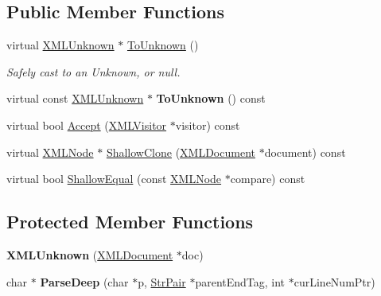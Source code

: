 \subsection*{Public Member Functions}
\begin{DoxyCompactItemize}
\item 
\mbox{\label{classCPlantBox_1_1tinyxml2_1_1XMLUnknown_afc765e12c96c97fe03571476ef8ecbb1}} 
virtual \hyperlink{classCPlantBox_1_1tinyxml2_1_1XMLUnknown}{X\+M\+L\+Unknown} $\ast$ \hyperlink{classCPlantBox_1_1tinyxml2_1_1XMLUnknown_afc765e12c96c97fe03571476ef8ecbb1}{To\+Unknown} ()
\begin{DoxyCompactList}\small\item\em Safely cast to an Unknown, or null. \end{DoxyCompactList}\item 
\mbox{\label{classCPlantBox_1_1tinyxml2_1_1XMLUnknown_a9d1c9278241128a1f4452f79d3888e01}} 
virtual const \hyperlink{classCPlantBox_1_1tinyxml2_1_1XMLUnknown}{X\+M\+L\+Unknown} $\ast$ {\bfseries To\+Unknown} () const
\item 
virtual bool \hyperlink{classCPlantBox_1_1tinyxml2_1_1XMLUnknown_a706a5d7b3056facf31ba66a316ddf912}{Accept} (\hyperlink{classCPlantBox_1_1tinyxml2_1_1XMLVisitor}{X\+M\+L\+Visitor} $\ast$visitor) const
\item 
virtual \hyperlink{classCPlantBox_1_1tinyxml2_1_1XMLNode}{X\+M\+L\+Node} $\ast$ \hyperlink{classCPlantBox_1_1tinyxml2_1_1XMLUnknown_ae4ab3d5b1c02b09ad91729cc12f2e08e}{Shallow\+Clone} (\hyperlink{classCPlantBox_1_1tinyxml2_1_1XMLDocument}{X\+M\+L\+Document} $\ast$document) const
\item 
virtual bool \hyperlink{classCPlantBox_1_1tinyxml2_1_1XMLUnknown_a22777b08f33f0e23c9e2f768a3fbd92f}{Shallow\+Equal} (const \hyperlink{classCPlantBox_1_1tinyxml2_1_1XMLNode}{X\+M\+L\+Node} $\ast$compare) const
\end{DoxyCompactItemize}
\subsection*{Protected Member Functions}
\begin{DoxyCompactItemize}
\item 
\mbox{\label{classCPlantBox_1_1tinyxml2_1_1XMLUnknown_ae06353aabeec60974728e0d0a59ea7db}} 
{\bfseries X\+M\+L\+Unknown} (\hyperlink{classCPlantBox_1_1tinyxml2_1_1XMLDocument}{X\+M\+L\+Document} $\ast$doc)
\item 
\mbox{\label{classCPlantBox_1_1tinyxml2_1_1XMLUnknown_a5e1aa4bec3a41c4d13c07e73b419aedb}} 
char $\ast$ {\bfseries Parse\+Deep} (char $\ast$p, \hyperlink{classCPlantBox_1_1tinyxml2_1_1StrPair}{Str\+Pair} $\ast$parent\+End\+Tag, int $\ast$cur\+Line\+Num\+Ptr)
\end{DoxyCompactItemize}
